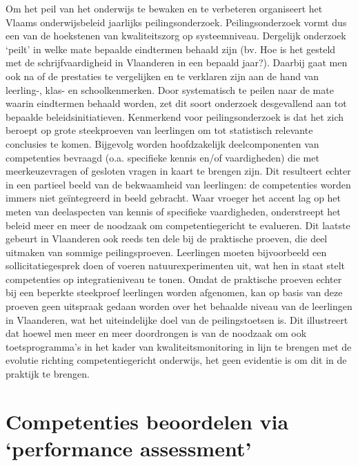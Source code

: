 \documentclass[
  letterpaper,
]{report}
\begin{document}
Om het peil van het onderwijs te bewaken en te verbeteren organiseert
het Vlaams onderwijsbeleid jaarlijks peilingsonderzoek.
Peilingsonderzoek vormt dus een van de hoekstenen van kwaliteitszorg op
systeemniveau. Dergelijk onderzoek `peilt' in welke mate bepaalde
eindtermen behaald zijn (bv. Hoe is het gesteld met de
schrijfvaardigheid in Vlaanderen in een bepaald jaar?). Daarbij gaat men
ook na of de prestaties te vergelijken en te verklaren zijn aan de hand
van leerling-, klas- en schoolkenmerken. Door systematisch te peilen
naar de mate waarin eindtermen behaald worden, zet dit soort onderzoek
desgevallend aan tot bepaalde beleidsinitiatieven. Kenmerkend voor
peilingsonderzoek is dat het zich beroept op grote steekproeven van
leerlingen om tot statistisch relevante conclusies te komen. Bijgevolg
worden hoofdzakelijk deelcomponenten van competenties bevraagd (o.a.
specifieke kennis en/of vaardigheden) die met meerkeuzevragen of
gesloten vragen in kaart te brengen zijn. Dit resulteert echter in een
partieel beeld van de bekwaamheid van leerlingen: de competenties worden
immers niet geïntegreerd in beeld gebracht. Waar vroeger het accent lag
op het meten van deelaspecten van kennis of specifieke vaardigheden,
onderstreept het beleid meer en meer de noodzaak om competentiegericht
te evalueren. Dit laatste gebeurt in Vlaanderen ook reeds ten dele bij
de praktische proeven, die deel uitmaken van sommige peilingsproeven.
Leerlingen moeten bijvoorbeeld een sollicitatiegesprek doen of voeren
natuurexperimenten uit, wat hen in staat stelt competenties op
integratieniveau te tonen. Omdat de praktische proeven echter bij een
beperkte steekproef leerlingen worden afgenomen, kan op basis van deze
proeven geen uitspraak gedaan worden over het behaalde niveau van de
leerlingen in Vlaanderen, wat het uiteindelijke doel van de
peilingstoetsen is. Dit illustreert dat hoewel men meer en meer
doordrongen is van de noodzaak om ook toetsprogramma's in het kader van
kwaliteitsmonitoring in lijn te brengen met de evolutie richting
competentiegericht onderwijs, het geen evidentie is om dit in de
praktijk te brengen.

\hypertarget{competenties-beoordelen-via-performance-assessment}{%
\section{Competenties beoordelen via `performance
assessment'}\label{competenties-beoordelen-via-performance-assessment}}
\end{document}
